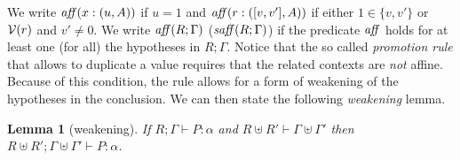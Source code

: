 \documentclass[11pt]{article}
\newtheorem{lemma}[theorem]{Lemma}
\newcommand{\Gives}{\vdash}             \newcommand{\IGives}{\vdash_{I}}        \newcommand{\AIGives}{\vdash_{{\it AI}}} \newcommand{\CGives}{\vdash_{C}}
\newcommand{\hyp}[3]{#1:(#2, #3)}
\newcommand{\csum}{\uplus}              \newcommand{\dpar}{\mid\!\mid}
\newcommand{\set}[1]{\{#1\}}
\newcommand{\upair}[2]{[#1,#2]}
\newcommand{\vlt}[1]{{\cal V}(#1)}
\begin{document}
We write $\w{aff}(\hyp{x}{u}{A})$ if $u=1$ and
$\w{aff}(\hyp{r}{\upair{v}{v'}}{A})$ if either $1\in \set{v,v'}$ or
$\vlt{r}$ and $v'\neq 0$. We write ${\it aff}(R;\Gamma)$ (${\it saff}(R;\Gamma)$)
if the predicate ${\it aff}$ holds for at least one (for all) the hypotheses in
$R;\Gamma$. Notice that the so called {\em promotion rule} that allows to
duplicate a value requires that the related contexts are {\em not}
affine.  Because of this condition, the rule allows for a form of
weakening of the hypotheses in the conclusion.  We can then state the
following {\em weakening} lemma.

\begin{lemma}[weakening]
If $R;\Gamma \Gives P:\alpha$ and $R\csum R'\Gives \Gamma\csum \Gamma'$ then
$R\csum R';\Gamma\csum \Gamma'\Gives P:\alpha$.
\end{lemma}
\end{document}
